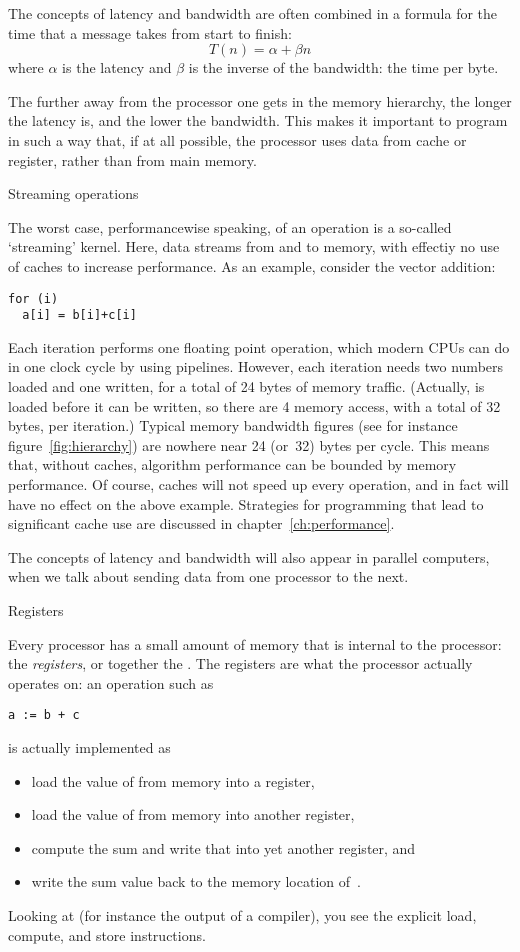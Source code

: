 The concepts of latency and bandwidth are often combined in a formula
for the time that a message takes from start to finish:
\[ T(n) = \alpha+\beta n \]
where $\alpha$ is the latency and $\beta$ is the inverse of the
bandwidth: the time per byte.

The further away from the processor one gets
in the memory hierarchy, the longer
the latency is, and the lower the bandwidth.
This makes it important to program in such a
way that, if at all possible,
the processor uses data from cache or register,
rather than from main memory. 

 {Streaming operations}

The worst case, performancewise speaking, of an operation
is a so-called `streaming' kernel.
Here, data streams from and to memory, with effectiy no use of caches
to increase performance.
As an example, consider the vector addition:
\begin{lstlisting}
for (i)
  a[i] = b[i]+c[i]
\end{lstlisting}
Each iteration performs one floating point operation, which modern
\acp{CPU} can do in one clock cycle by using pipelines. However, each
iteration needs two numbers loaded and one written, for a total of 24
bytes of memory traffic.
(Actually,  is loaded before it can be written,
so there are 4 memory access, with a total of 32 bytes, per
iteration.)
Typical memory bandwidth figures (see
for instance figure~\ref{fig:hierarchy}) are nowhere near 24 (or~32) bytes per
cycle. This means that, without caches, algorithm performance can be
bounded by memory performance. Of course, caches will not speed up
every operation, and in fact will have no effect on the above
example.
Strategies for programming that lead to significant cache use are discussed in chapter~\ref{ch:performance}.

The concepts of latency and bandwidth will also appear in parallel
computers, when we talk about sending data from one processor to the
next.

 {Registers}
\label{sec:register}

Every processor has a small amount of memory that is internal to the
processor: the \emph{registers}, or together the
. The registers are what the processor
actually operates on: an operation such as 
\begin{lstlisting}
a := b + c
\end{lstlisting}
is actually implemented as 
\begin{itemize}
\item load the value of  from memory into a register,
\item load the value of  from memory into another register,
\item compute the sum and write that into yet another register, and
\item write the sum value back to the memory location of~.
\end{itemize}
Looking at 
(for instance the output of a compiler),
you see the explicit load, compute, and store instructions.

